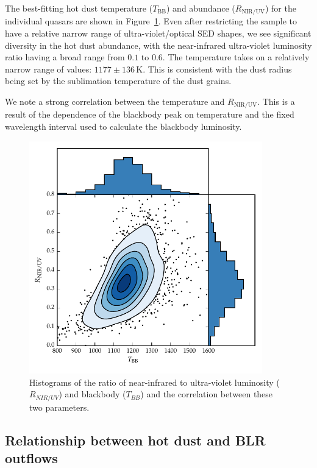 The best-fitting hot dust temperature ($T_{\text{BB}}$) and abundance ($R_{\text{NIR/UV}}$) for the individual quasars are shown in Figure~\ref{fig:ratio_tbb_density}.
Even after restricting the sample to have a relative narrow range of ultra-violet/optical SED shapes, we see significant diversity in the hot dust abundance, with the near-infrared ultra-violet luminosity ratio having a broad range from $0.1$ to $0.6$.
The temperature takes on a relatively narrow range of values: $1177\pm136$\,K. 
This is consistent with the dust radius being set by the sublimation temperature of the dust grains. 

We note a strong correlation between the temperature and $R_{\text{NIR/UV}}$. 
This is a result of the dependence of the blackbody peak on temperature and the fixed wavelength interval used to calculate the blackbody luminosity. 

\begin{figure}[t!]
  \centering
  \includegraphics[width=0.9\textwidth]{figures/chapter05/ratio_tbb_density.pdf}
  \caption[{Ratio of near-infrared to ultra-violet luminosity ($R_{NIR/UV}$) against temperature ($T_{BB}$) for low-$z$ sample.}]{Histograms of the ratio of near-infrared to ultra-violet luminosity ($R_{NIR/UV}$) and blackbody ($T_{BB}$) and the correlation between these two parameters. }
  \label{fig:ratio_tbb_density}
\end{figure}

\subsection{Relationship between hot dust and BLR outflows}

